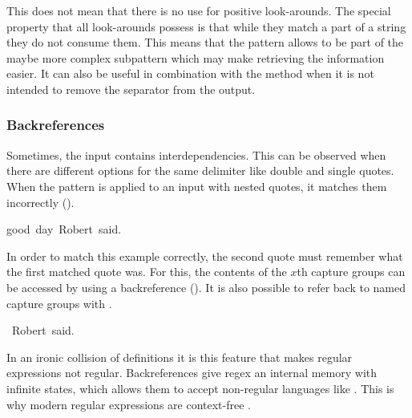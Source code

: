This does not mean that there is no use for positive look-arounds. The special property that all look-arounds possess is that while they match a part of a string they do not consume them. This means that the pattern  allows  to be part of the maybe more complex subpattern  which may make retrieving the information easier. It can also be useful in combination with the  method when it is not intended to remove the separator from the output.

\subsubsection{Backreferences}

Sometimes, the input contains interdependencies. This can be observed when there are different options for the same delimiter like double and single quotes. When the pattern  is applied to an input with nested quotes, it matches them incorrectly ().

\begin{listingBoxFigure}[title={Nested quotes matched incorrectly by \pattern{("|').*?("|')}},label=fig:regexNestedQuotes,width=14cm,center]
    good~day~Robert~said.
\end{listingBoxFigure}


In order to match this example correctly, the second quote must remember what the first matched quote was. For this, the contents of the $x$th capture groups can be accessed by using a backreference  (). It is also possible to refer back to named capture groups with .

\begin{listingBoxFigure}[title={Nested quotes matched correctly by \pattern{("|').*?\bs 1}},label=fig:regexNestedQuotesBackref,width=14cm,center]
    ~Robert~said.
\end{listingBoxFigure}

In an ironic collision of definitions it is this feature that makes regular expressions not regular. Backreferences give regex an internal memory with infinite states, which allows them to accept non-regular languages like . This is why modern regular expressions are context-free \cite{regexIsContextFree}.


